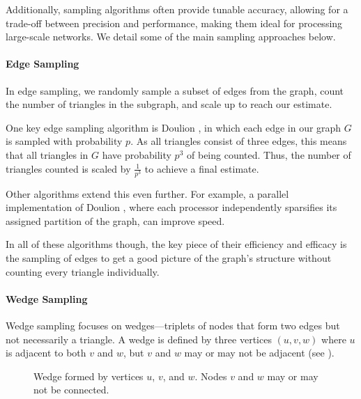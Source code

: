 \documentclass[11pt, margin=1in]{article}
\begin{document}
Additionally, sampling algorithms often provide tunable accuracy, allowing for a trade-off between precision and performance, making them ideal for processing large-scale networks.
We detail some of the main sampling approaches below.

\paragraph{Edge Sampling}

In edge sampling, we randomly sample a subset of edges from the graph, count the number of triangles in the subgraph, and scale up to reach our estimate.

One key edge sampling algorithm is Doulion \cite{tsourakakis_doulion_2009}, in which each edge in our graph $G$ is sampled with probability $p$.
As all triangles consist of three edges, this means that all triangles in $G$ have probability $p^3$ of being counted.
Thus, the number of triangles counted is scaled by $\frac{1}{p^3}$ to achieve a final estimate.

Other algorithms extend this even further.
For example, a parallel implementation of Doulion \cite{arifuzzaman_parallel_2012}, where each processor independently sparsifies its assigned partition of the graph, can improve speed.

In all of these algorithms though, the key piece of their efficiency and efficacy is the sampling of edges to get a good picture of the graph's structure without counting every triangle individually.

\paragraph{Wedge Sampling}

Wedge sampling \cite{seshadhri_triadic_2013} focuses on wedges—triplets of nodes that form two edges but not necessarily a triangle.
A wedge is defined by three vertices $(u, v, w)$ where $u$ is adjacent to both $v$ and $w$, but $v$ and $w$ may or may not be adjacent (see ).

\begin{figure}[H]
    \centering
    \caption{Wedge formed by vertices $u$, $v$, and $w$. Nodes $v$ and $w$ may or may not be connected.}
    \label{fig:wedge_diagram}
\end{figure}
\end{document}
